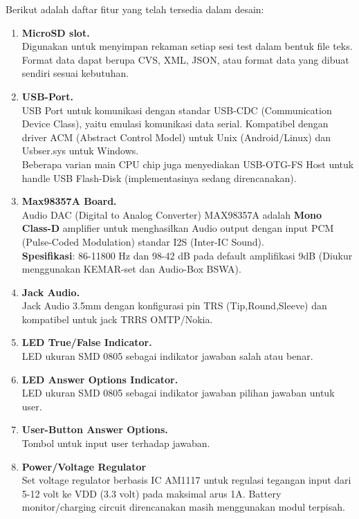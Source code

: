 \documentclass[12pt,]{article}
\begin{document}
	Berikut adalah daftar fitur yang telah tersedia dalam desain:
	\begin{enumerate}
		\item \textbf{MicroSD slot.}\\
		Digunakan untuk menyimpan rekaman setiap sesi test dalam bentuk file teks.
		Format data dapat berupa CVS, XML, JSON, atau format data yang dibuat sendiri sesuai kebutuhan.
		
		\item \textbf{USB-Port.}\\
		USB Port untuk komunikasi dengan standar USB-CDC (Communication Device Class), yaitu emulasi komunikasi data serial.
		Kompatibel dengan driver ACM (Abstract Control Model) untuk Unix (Android/Linux) dan Usbser.sys untuk Windows.\\
		Beberapa varian main CPU chip juga menyediakan USB-OTG-FS Host untuk handle USB Flash-Disk (implementasinya sedang direncanakan).
		
		\newpage
		\item \textbf{Max98357A Board.}\\
		Audio DAC (Digital to Analog Converter) MAX98357A adalah \textbf{Mono Class-D} amplifier untuk menghasilkan Audio output dengan input
		PCM (Pulse-Coded Modulation) standar I2S (Inter-IC Sound).\\
		\textbf{Spesifikasi}: 86-11800 Hz dan 98-42 dB pada default amplifikasi 9dB (Diukur menggunakan KEMAR-set dan Audio-Box BSWA).
		
		\item \textbf{Jack Audio.}\\ 
		Jack Audio 3.5mm dengan konfigurasi pin TRS (Tip,Round,Sleeve) dan kompatibel untuk jack TRRS OMTP/Nokia.
		
		\item \textbf{LED True/False Indicator.}\\
		LED ukuran SMD 0805 sebagai indikator jawaban salah atau benar.
		
		\item \textbf{LED Answer Options Indicator.}\\
		LED ukuran SMD 0805 sebagai indikator jawaban pilihan jawaban untuk user.
		
		\item \textbf{User-Button Answer Options.}\\
		Tombol untuk input user terhadap jawaban.
		
		\item \textbf{Power/Voltage Regulator}\\
		Set voltage regulator berbasis IC AM1117 untuk regulasi tegangan input dari 5-12 volt ke VDD (3.3 volt) pada maksimal arus 1A.
		Battery monitor/charging circuit direncanakan masih menggunakan modul terpisah.
		

\end{enumerate}
\end{document}
